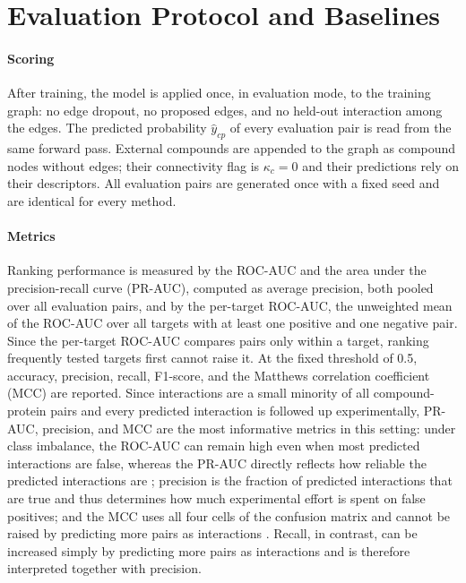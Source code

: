 \documentclass[11pt,letterpaper]{article}
\begin{document}
\section{Evaluation Protocol and Baselines}
\label{sec:evaluation}

\paragraph{Scoring}
After training, the model is applied once, in evaluation mode, to the training graph: no edge dropout, no proposed edges, and no held-out interaction among the edges. The predicted probability $\hat{y}_{cp}$ of every evaluation pair is read from the same forward pass. External compounds are appended to the graph as compound nodes without edges; their connectivity flag is $\kappa_c=0$ and their predictions rely on their descriptors. All evaluation pairs are generated once with a fixed seed and are identical for every method.

\paragraph{Metrics}
Ranking performance is measured by the ROC-AUC and the area under the precision-recall curve (PR-AUC), computed as average precision, both pooled over all evaluation pairs, and by the per-target ROC-AUC, the unweighted mean of the ROC-AUC over all targets with at least one positive and one negative pair. Since the per-target ROC-AUC compares pairs only within a target, ranking frequently tested targets first cannot raise it. At the fixed threshold of 0.5, accuracy, precision, recall, F1-score, and the Matthews correlation coefficient (MCC) are reported. Since interactions are a small minority of all compound-protein pairs and every predicted interaction is followed up experimentally, PR-AUC, precision, and MCC are the most informative metrics in this setting: under class imbalance, the ROC-AUC can remain high even when most predicted interactions are false, whereas the PR-AUC directly reflects how reliable the predicted interactions are \cite{saito2015precision}; precision is the fraction of predicted interactions that are true and thus determines how much experimental effort is spent on false positives; and the MCC uses all four cells of the confusion matrix and cannot be raised by predicting more pairs as interactions \cite{chicco2020advantages}. Recall, in contrast, can be increased simply by predicting more pairs as interactions and is therefore interpreted together with precision.
\end{document}
